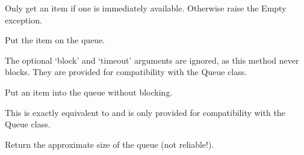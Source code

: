\documentclass[letterpaper,10pt,english]{sphinxmanual}
\begin{document}
\begin{fulllineitems}
\begin{fulllineitems}
\sphinxAtStartPar
Only get an item if one is immediately available. Otherwise
raise the Empty exception.

\end{fulllineitems}


\begin{fulllineitems}
\label{\detokenize{queue:queue.SimpleQueue.put}}
\pysigstartsignatures
{}
\pysigstopsignatures
\sphinxAtStartPar
Put the item on the queue.

\sphinxAtStartPar
The optional ‘block’ and ‘timeout’ arguments are ignored, as this method
never blocks.  They are provided for compatibility with the Queue class.

\end{fulllineitems}


\begin{fulllineitems}
\label{\detokenize{queue:queue.SimpleQueue.put_nowait}}
\pysigstartsignatures
{}
\pysigstopsignatures
\sphinxAtStartPar
Put an item into the queue without blocking.

\sphinxAtStartPar
This is exactly equivalent to  and is only provided
for compatibility with the Queue class.

\end{fulllineitems}


\begin{fulllineitems}
\label{\detokenize{queue:queue.SimpleQueue.qsize}}
\pysigstartsignatures
{}
\pysigstopsignatures
\sphinxAtStartPar
Return the approximate size of the queue (not reliable!).

\end{fulllineitems}


\end{fulllineitems}
\end{document}
